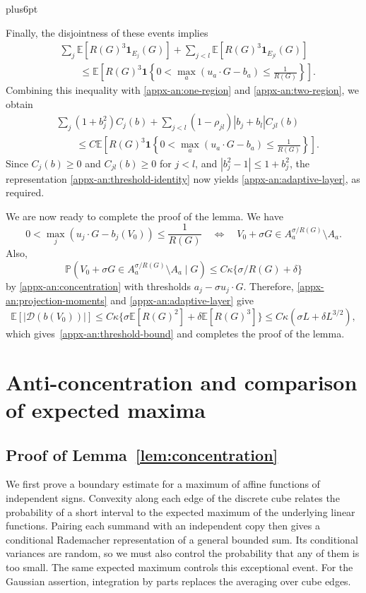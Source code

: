 \documentclass[11pt,letterpaper,twoside,leqno]{article}
\makeatletter
\theoremstyle{bookplain}
\theoremstyle{bookremark}
\renewenvironment{proof}[1][\proofname]{\par
  \pushQED{\qed}\normalfont\topsep6pt plus6pt\relax
  \trivlist\item[\hskip\labelsep\bfseries #1\@addpunct{.}]\ignorespaces
}{\popQED\endtrivlist\@endpefalse}
\newcommand{\E}{\mathbb E}
\newcommand{\Pp}{\mathbb P}
\newcommand{\ind}{\mathbf 1}
\makeatother
\begin{document}
\begin{proof}
Finally, the disjointness of these events implies
\[
\begin{aligned}
&\sum_j\E[R(G)^3\ind_{E_j}(G)]
+\sum_{j<l}\E[R(G)^3\ind_{E_{jl}}(G)]\\
&\qquad\le
\E\left[
R(G)^3\ind\left\{
0<\max_a(u_a\cdot G-b_a)\le\frac1{R(G)}
\right\}\right].
\end{aligned}
\]
Combining this inequality with \eqref{appx-an:one-region}
and \eqref{appx-an:two-region}, we obtain
\[
\begin{aligned}
&\sum_j(1+b_j^2)C_j(b)
+\sum_{j<l}(1-\rho_{jl})|b_j+b_l|C_{jl}(b)\\
&\qquad\le C\E\left[
R(G)^3\ind\left\{
0<\max_a(u_a\cdot G-b_a)\le\frac1{R(G)}
\right\}\right].
\end{aligned}
\]
Since \(C_j(b)\ge0\) and \(C_{jl}(b)\ge0\) for \(j<l\), and
\(|b_j^2-1|\le1+b_j^2\), the representation
\eqref{appx-an:threshold-identity} now yields
\eqref{appx-an:adaptive-layer}, as required.


We are now ready to complete the proof of the lemma. We have
$$
0<\max_j(u_j\cdot G-b_j(V_0))
 \le\frac1{R(G)} \quad \Longleftrightarrow \quad V_0+\sigma G\in A_a^{\sigma/R(G)}\setminus A_a.
$$
Also,
$$
\Pp\left(V_0+\sigma G\in A_a^{\sigma/R(G)}\setminus A_a \mid G\right) {\leq C\kappa\{\sigma/R(G)+\delta\}}
$$
by \eqref{appx-an:concentration} with thresholds \(a_j-\sigma u_j\cdot G\). Therefore, \eqref{appx-an:projection-moments} and \eqref{appx-an:adaptive-layer}
give
\[
 \E[|\mathcal D(b(V_0))|]
{\le C\kappa\{\sigma\E[R(G)^2]+\delta\E[R(G)^3]\}
 \le C\kappa(\sigma L+\delta L^{3/2}),}
\]
which gives~\eqref{appx-an:threshold-bound} and completes the proof of the lemma.
\end{proof}
\par\endgroup

\section{Anti-concentration and comparison of expected maxima}\label{appx-app:concentration}
\label{appx-conc:conditioning}

\subsection{Proof of Lemma~\ref*{lem:concentration}}

We first prove a boundary estimate for a maximum of affine functions
of independent signs. Convexity along each edge of the discrete cube
relates the probability of a short interval to the expected maximum
of the underlying linear functions. Pairing each summand with an
independent copy then gives a conditional Rademacher representation
of a general bounded sum. Its conditional variances are random, so
we must also control the probability that any of them is too small.
The same expected maximum controls this exceptional event.
For the Gaussian assertion, integration by parts replaces the
averaging over cube edges.
\end{document}
